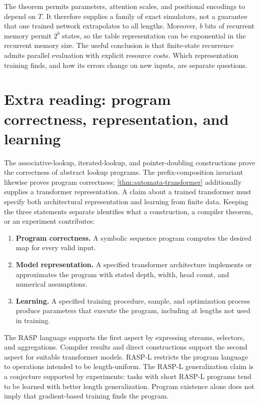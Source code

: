 \documentclass[11pt,twoside]{article}
\theoremstyle{definition}
\theoremstyle{remark}
\begin{document}
The theorem permits parameters, attention scales, and positional encodings
to depend on \(T\). It therefore supplies a family of exact simulators,
not a guarantee that one trained network extrapolates to all lengths.
Moreover, \(b\) bits of recurrent memory permit \(2^b\) states, so the
table representation can be exponential in the recurrent memory size.
The useful conclusion is that finite-state recurrence admits parallel
evaluation with explicit resource costs. Which representation training
finds, and how its errors change on new inputs, are separate questions.

\section{Extra reading: program correctness, representation, and learning}
\label{sec:claims}

The associative-lookup, iterated-lookup, and pointer-doubling constructions
prove the correctness of abstract lookup programs. The prefix-composition
invariant likewise proves program correctness; \cref{thm:automata-transformer}
additionally supplies a transformer representation.
A claim about a trained transformer must specify both architectural
representation and learning from finite data.
Keeping the three statements separate identifies what a construction, a
compiler theorem, or an experiment contributes:
\begin{enumerate}[leftmargin=*]
\item \textbf{Program correctness.} A symbolic sequence program computes the
desired map for every valid input.
\item \textbf{Model representation.} A specified transformer architecture
implements or approximates the program with stated depth, width, head count,
and numerical assumptions.
\item \textbf{Learning.} A specified training procedure, sample, and
optimization process produce parameters that execute the program, including
at lengths not used in training.
\end{enumerate}
The RASP language supports the first aspect by expressing streams, selectors,
and aggregations. Compiler results and direct constructions support the
second aspect for suitable transformer models. RASP-L restricts the program
language to operations intended to be length-uniform. The RASP-L
generalization claim is a conjecture supported by experiments: tasks with
short RASP-L programs tend to be learned with better length generalization.
Program existence alone does not imply that gradient-based training finds
the program.
\end{document}
